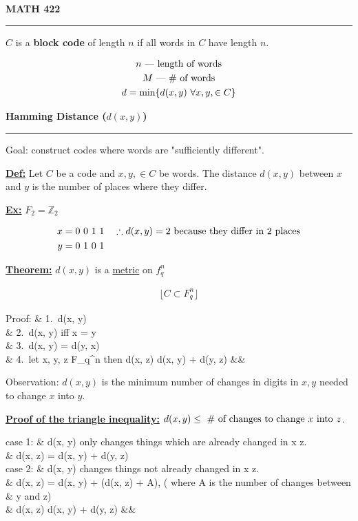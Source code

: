 \documentclass{article}
\newcommand{\header}[1]{
	\begin{Large}
	\noindent\textbf{#1}
	\vspace{2pt}
	\hrule
	\vspace{16pt}
	\end{Large}
	\normalsize
}
\newcommand{\eqs}[1]{
	\begin{gather*}
		#1
	\end{gather*}
}
\renewcommand{\b}[1]{\textbf{#1}}
\newcommand{\ul}[1]{\underline{#1}}
\newcommand{\dash}{\textnormal{ \textemdash}}
\renewcommand{\aligned}[1]{
	\begin{align*}
		#1
	\end{align*}
}
\newcommand{\laligned}[1]{
	\begin{flalign*}
		#1 &&
	\end{flalign*}
}
\newcommand{\newdef}[2]{\b{\ul{#1:}} #2}
\renewcommand{\iff}{\textnormal{ iff }}
\begin{document}
\header{MATH 422}

$C$ is a \b{block code} of length $n$ if all words in $C$ have length $n$.

\eqs{
	n \dash \textnormal{ length of words}                \\
	M \dash \textnormal{ \# of words}                    \\
	d = \textnormal{min}\{d(x, y)\ \forall x, y, \in C\}
}

\header{Hamming Distance ($d(x, y)$)}

Goal: construct codes where words are "sufficiently different".

\newdef{Def}{
	Let $C$ be a code and $x, y, \in C$ be words. The distance $d(x, y)$
	between $x$ and $y$ is the number of places where they differ.
}

\newdef{Ex}{
	$F_2 = \mathbb{Z}_2$
	\aligned{
		x = 0\ 0\ 1\ 1 & \hspace{10px} \therefore d(x, y) = 2
		\textnormal{ because they differ in 2 places}         \\
		y = 0\ 1\ 0\ 1 &                                      \\
	}
}

\newdef{Theorem}{
	$d(x, y)$ is a \ul{metric} on $f_q^n$
	\eqs{\lfloor C \subset F_q^n\rfloor}
}
\laligned{
	\textnormal{Proof: } & 1.\ d(x, y)           \\
	& 2.\ d(x, y) \iff x = y                           \\
	& 3.\ d(x, y) = d(y, x)                            \\
	& 4.\ \textnormal{let } x, y, z \in F_q^n
	\textnormal{ then } d(x, z) \leq d(x, y) + d(y, z)
}

Observation: $d(x, y)$ is the  minimum number of changes in digits in $x, y$
needed to change $x$ into $y$.

\newdef{Proof of the triangle inequality}{
	$d(x, y) \leq \textnormal{ \# of changes to change } x
		\textnormal{ into } z$.
	\laligned{
		\textnormal{case 1: } & d(x, y) \textnormal{ only changes
			things which are already changed in } x \rightarrow
		z. \\
		& \therefore d(x, z) = d(x, y) + d(y, z) \\
		\textnormal{case 2: } & d(x, y) \textnormal{ changes things not
			already changed in } x \rightarrow z. \\
		& \therefore d(x, z) = d(x, y) + (d(x, z) + A), (
		\textnormal{where } A \textnormal{ is the number of changes
			between } \\
		& y \textnormal{ and } z) \\
		& \therefore d(x, z) \geq d(x, y) + d(y, z)
	}
}
\end{document}
